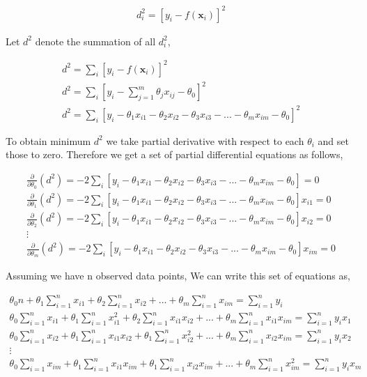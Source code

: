 \documentclass[english]{tktltiki}
\begin{document}
\begin{eqnarray}
d^2_i = [y_i - f(\mathbf{x}_i)]^2
\end{eqnarray}

Let $d^2$ denote the summation of all $d^2_i$,

\begin{eqnarray}
d^2 = \sum_i[y_i - f(\mathbf{x}_i)]^2 \nonumber\\
d^2 = \sum_i[y_i - \sum_{j=1}^m \theta_j x_{ij} - \theta_0]^2 \nonumber\\
d^2 = \sum_i[y_i - \theta_1x_{i1} - \theta_2x_{i2} - \theta_3x_{i3} - ... - \theta_mx_{im} - \theta_0]^2
\end{eqnarray}

To obtain minimum $d^2$ we take partial derivative with respect to each $\theta_i$ and set those to zero. Therefore we get a set of partial differential equations as follows,

\begin{eqnarray}
\frac{\partial}{\partial{\theta_0}}(d^2) = -2\sum_i[y_i - \theta_1x_{i1} - \theta_2x_{i2} - \theta_3x_{i3} - ... - \theta_mx_{im} - \theta_0] = 0\nonumber \\
\frac{\partial}{\partial{\theta_1}}(d^2) = -2\sum_i[y_i - \theta_1x_{i1} - \theta_2x_{i2} - \theta_3x_{i3} - ... - \theta_mx_{im} - \theta_0]x_{i1} = 0\nonumber \\
\frac{\partial}{\partial{\theta_2}}(d^2) = -2\sum_i[y_i - \theta_1x_{i1} - \theta_2x_{i2} - \theta_3x_{i3} - ... - \theta_mx_{im} - \theta_0]x_{i2} = 0\nonumber \\
\vdots \nonumber \\
\frac{\partial}{\partial{\theta_m}}(d^2) = -2\sum_i[y_i - \theta_1x_{i1} - \theta_2x_{i2} - \theta_3x_{i3} - ... - \theta_mx_{im} - \theta_0]x_{im} = 0
\end{eqnarray}

Assuming we have n observed data points, We can write this set of equations as,

\begin{eqnarray}
\theta_0 n + \theta_1 \sum_{i=1}^n x_{i1} + \theta_2 \sum_{i=1}^n x_{i2} + ... + \theta_m \sum_{i=1}^n x_{im} = \sum_{i=1}^n y_i \nonumber \\
\theta_0 \sum_{i=1}^n x_{i1} + \theta_1 \sum_{i=1}^n x_{i1}^2 + \theta_2 \sum_{i=1}^n x_{i1} x_{i2} +  ... + \theta_m \sum_{i=1}^n x_{i1} x_{im} = \sum_{i=1}^n y_i x_1 \nonumber \\
\theta_0 \sum_{i=1}^n x_{i2} + \theta_1 \sum_{i=1}^n x_{i1} x_{i2} + \theta_1 \sum_{i=1}^n x_{i2}^2 + ... + \theta_m \sum_{i=1}^n x_{i2} x_{im} = \sum_{i=1}^n y_i x_2 \nonumber \\
\vdots \nonumber \\
\theta_0 \sum_{i=1}^n x_{im} + \theta_1 \sum_{i=1}^n x_{i1} x_{im} + \theta_1 \sum_{i=1}^n x_{i2} x_{im} + ... + \theta_m \sum_{i=1}^n x_{im}^2 = \sum_{i=1}^n y_i x_m
\end{eqnarray}
\end{document}
